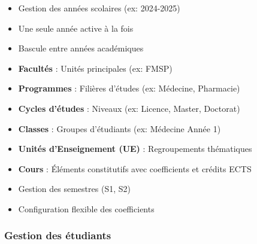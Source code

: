 \begin{description}[leftmargin=3cm, style=nextline]
    \item[Années académiques]
    \begin{itemize}
        \item Gestion des années scolaires (ex: 2024-2025)
        \item Une seule année active à la fois
        \item Bascule entre années académiques
    \end{itemize}

    \item[Hiérarchie organisationnelle]
    \begin{itemize}
        \item \textbf{Facultés} : Unités principales (ex: FMSP)
        \item \textbf{Programmes} : Filières d'études (ex: Médecine, Pharmacie)
        \item \textbf{Cycles d'études} : Niveaux (ex: Licence, Master, Doctorat)
        \item \textbf{Classes} : Groupes d'étudiants (ex: Médecine Année 1)
    \end{itemize}

    \item[Structure pédagogique]
    \begin{itemize}
        \item \textbf{Unités d'Enseignement (UE)} : Regroupements thématiques
        \item \textbf{Cours} : Éléments constitutifs avec coefficients et crédits ECTS
        \item Gestion des semestres (S1, S2)
        \item Configuration flexible des coefficients
    \end{itemize}
\end{description}

\subsubsection{Gestion des étudiants}

